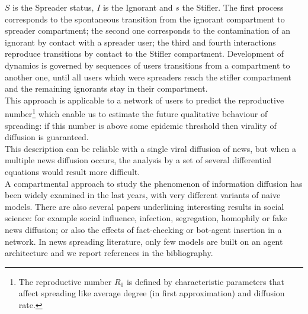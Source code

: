 $S$ is the Spreader status, $I$ is the Ignorant and $s$ the Stifler. 
The first process corresponds to the spontaneous transition from the ignorant compartment to spreader compartment;
 the second one corresponds to the contamination of an ignorant by contact with a spreader user; 
the third and fourth interactions reproduce transitions by contact to the Stifler compartment.
Development of dynamics is governed by sequences of users transitions from a compartment to another one, until all users which were spreaders reach the stifler compartment and the remaining ignorants stay in their compartment.\\
This approach is applicable to a network of users to predict the reproductive 
number\footnote{The reproductive number $R_{0}$ is defined by characteristic parameters that affect spreading like average degree (in first approximation) and diffusion rate. } 
which enable us to estimate the future qualitative behaviour of spreading: 
if this number is above some epidemic threshold then virality of diffusion is guaranteed.\\
This description can be reliable with a single viral diffusion of news, but when a
multiple news diffusion occurs, the analysis by a set of several differential equations would result more difficult.  
 \\ A compartmental approach to study the phenomenon of information diffusion has been widely examined in the last years, with very different variants of naive models.\cite{fedewa2013spread}\cite{tambuscio2016network}
There are also several papers underlining interesting results in social science: for example social influence, infection, segregation,\cite{henry2011emergence} homophily\cite{aiello2012friendship} or fake news diffusion;\cite{tambuscio2016network}\cite{nekovee2007theory} or also the effects of fact-checking or bot-agent insertion\cite{aiello2012people} in a network.
 In news spreading literature, only few models are built on an agent architecture and we report references in the bibliography.\cite{liu2011rumor}\cite{serrano2015novel}\cite{seo2012identifying}\cite{de2013simulation}\cite{serrano2016validating}



